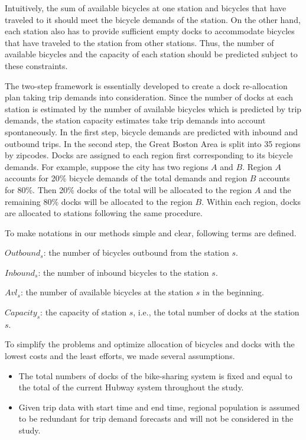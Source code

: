 \documentclass[journal, letterpaper]{IEEEtran}
\begin{document}
Intuitively, the sum of available bicycles at one station and bicycles that have traveled to it should meet the bicycle demands of the station. On the other hand, each station also has to provide sufficient empty docks to accommodate bicycles that have traveled to the station from other stations. Thus, the number of available bicycles and the capacity of each station should be predicted subject to these constraints. 

The two-step framework is essentially developed to create a dock re-allocation plan taking trip demands into consideration. Since the number of docks at each station is estimated by the number of available bicycles which is predicted by trip demands, the station capacity estimates take trip demands into account spontaneously. In the first step, bicycle demands are predicted with inbound and outbound trips. In the second step, the Great Boston Area is split into 35 regions by zipcodes. Docks are assigned to each region first corresponding to its bicycle demands. For example, suppose the city has two regions $A$ and $B$. Region $A$ accounts for 20\% bicycle demands of the total demands and region $B$ accounts for 80\%. Then 20\% docks of the total will be allocated to the region $A$ and the remaining 80\% docks will be allocated to the region $B$. Within each region, docks are allocated to stations following the same procedure.  

To make notations in our methods simple and clear, following terms are defined. 

$Outbound_{s}$: the number of bicycles outbound from the station $s$.

$Inbound_{s}$: the number of inbound bicycles to the station $s$. 

$Avl_{s}$: the number of available bicycles at the station $s$ in the beginning. 

$Capacity_{s}$: the capacity of station $s$, i.e., the total number of docks at the station $s$. 

To simplify the problems and optimize allocation of bicycles and docks with the lowest costs and the least efforts, we made several assumptions.

\begin{itemize}
\item The total numbers of docks of the bike-sharing system is fixed and equal to the total of the current Hubway system throughout the study.
\item Given trip data with start time and end time, regional population is assumed to be redundant for trip demand forecasts and will not be considered in the study.
\end{itemize} 
\end{document}
